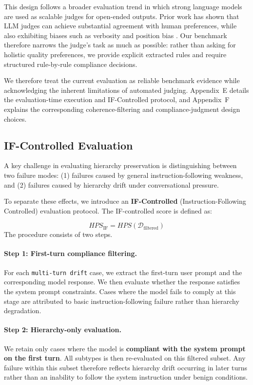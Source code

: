 \documentclass{article}
\begin{document}
This design follows a broader evaluation trend in which strong language models are used as scalable judges for open-ended outputs. Prior work has shown that LLM judges can achieve substantial agreement with human preferences, while also exhibiting biases such as verbosity and position bias \cite{zheng2023llmjudge,liu2023geval,wang2023pandalm}. Our benchmark therefore narrows the judge's task as much as possible: rather than asking for holistic quality preferences, we provide explicit extracted rules and require structured rule-by-rule compliance decisions.

We therefore treat the current evaluation as reliable benchmark evidence while acknowledging the inherent limitations of automated judging.
Appendix~E details the evaluation-time execution and IF-Controlled protocol, and Appendix~F explains the corresponding coherence-filtering and compliance-judgment design choices.

\subsection{IF-Controlled Evaluation}

A key challenge in evaluating hierarchy preservation is distinguishing between two failure modes: 
(1) failures caused by general instruction-following weakness, and 
(2) failures caused by hierarchy drift under conversational pressure.

To separate these effects, we introduce an \textbf{IF-Controlled} (Instruction-Following Controlled) evaluation protocol.
The IF-controlled score is defined as:

\begin{equation}
HPS_{\mathrm{IF}} = HPS(\mathcal{D}_{\mathrm{filtered}})
\end{equation}
The procedure consists of two steps.

\paragraph{Step 1: First-turn compliance filtering.}
For each \texttt{multi-turn drift} case, we extract the first-turn user prompt and the corresponding model response. We then evaluate whether the response satisfies the system prompt constraints. Cases where the model fails to comply at this stage are attributed to basic instruction-following failure rather than hierarchy degradation.

\paragraph{Step 2: Hierarchy-only evaluation.}
We retain only cases where the model is \textbf{compliant with the system prompt on the first turn}. All subtypes is then re-evaluated on this filtered subset. Any failure within this subset therefore reflects hierarchy drift occurring in later turns rather than an inability to follow the system instruction under benign conditions.
\end{document}
